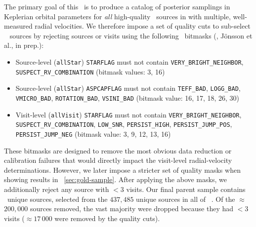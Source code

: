 The primary goal of this \documentname\ is to produce a catalog of posterior
samplings in Keplerian orbital parameters for \emph{all} high-quality \apogee\
sources in  with multiple, well-measured radial velocities.
We therefore impose a set of quality cuts to sub-select \apogee\  sources
by rejecting sources or visits using the following \apogee\
bitmasks (\citealt{Holtzman:2018}, J\"onsson et al., in prep.):
\begin{itemize}
    \item Source-level (\texttt{allStar}) \texttt{STARFLAG} must not contain
    \texttt{VERY\_BRIGHT\_NEIGHBOR}, \texttt{SUSPECT\_RV\_COMBINATION} (bitmask
    values: 3, 16)
    \item Source-level (\texttt{allStar}) \texttt{ASPCAPFLAG} must not contain
    \texttt{TEFF\_BAD}, \texttt{LOGG\_BAD}, \texttt{VMICRO\_BAD},
    \texttt{ROTATION\_BAD}, \texttt{VSINI\_BAD} (bitmask value: 16, 17, 18, 26,
    30)
    \item Visit-level (\texttt{allVisit}) \texttt{STARFLAG} must not contain
    \texttt{VERY\_BRIGHT\_NEIGHBOR}, \texttt{SUSPECT\_RV\_COMBINATION},
    \texttt{LOW\_SNR}, \texttt{PERSIST\_HIGH}, \texttt{PERSIST\_JUMP\_POS},
    \texttt{PERSIST\_JUMP\_NEG} (bitmask value: 3, 9, 12, 13, 16)
\end{itemize}
These bitmasks are designed to remove the most obvious data reduction or
calibration failures that would directly impact the visit-level radial-velocity
determinations.
However, we later impose a stricter set of quality masks when showing results in
\sectionname~\ref{sec:gold-sample}.
After applying the above masks, we additionally reject any source with $<3$
visits.
Our final parent sample contains \nsources\ unique sources, selected from the
$437,485$ unique sources in all of \apogee\ .
Of the $\approx$$200,000$ sources removed, the vast majority were dropped
because they had $<3$ visits ($\approx$$17\,000$ were removed by the quality
cuts).


